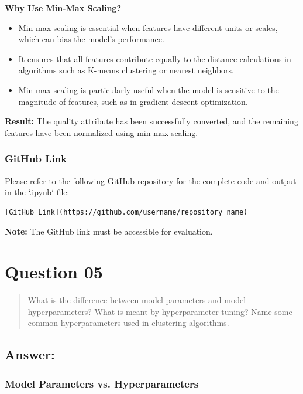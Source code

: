 \documentclass{exam}
\begin{document}
\textbf{Why Use Min-Max Scaling?}
\begin{itemize}
    \item Min-max scaling is essential when features have different units or scales, which can bias the model's performance.
    \item It ensures that all features contribute equally to the distance calculations in algorithms such as K-means clustering or nearest neighbors.
    \item Min-max scaling is particularly useful when the model is sensitive to the magnitude of features, such as in gradient descent optimization.
\end{itemize}

\textbf{Result:} The quality attribute has been successfully converted, and the remaining features have been normalized using min-max scaling.

\subsubsection{GitHub Link}

Please refer to the following GitHub repository for the complete code and output in the `.ipynb` file:

\begin{verbatim}
[GitHub Link](https://github.com/username/repository_name)
\end{verbatim}

\textbf{Note:} The GitHub link must be accessible for evaluation.

\section{Question 05}

\begin{quote}
What is the difference between model parameters and model hyperparameters? What is meant by hyperparameter tuning? Name some common hyperparameters used in clustering algorithms.
\end{quote}

\subsection{Answer:}

\subsubsection{Model Parameters vs. Hyperparameters}
\end{document}
